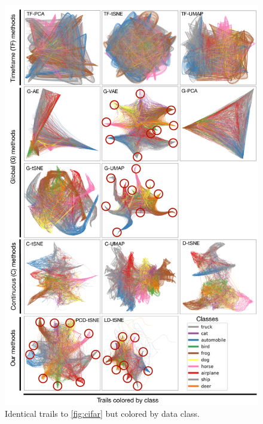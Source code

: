 \begin{figure}[htb!]
  \centering
  \includegraphics[width=\linewidth]{figures/projection-algorithm/cifar-b.png}
  \caption{Identical trails to \cref{fig:cifar} but colored by data class.}  
  \label{fig:cifar-b}
\end{figure}


